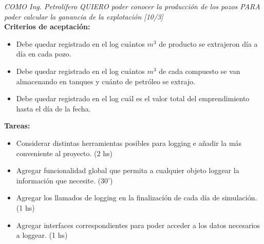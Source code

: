 \begin{tcolorbox}
\textit{ COMO Ing. Petrolífero QUIERO poder conocer la producción de los pozos PARA poder calcular la ganancia de la explotación [10/3]}\\

\textbf{Criterios de aceptación:}
\begin{itemize}
	\item Debe quedar registrado en el log cuántos $m^3$ de producto se extrajeron día a día en cada pozo.
    \item Debe quedar registrado en el log cuántos $m^3$ de cada compuesto se van almacenando en tanques y cuánto de petróleo se extrajo.
    \item Debe quedar registrado en el log cuál es el valor total del emprendimiento hasta el día de la fecha.
\end{itemize}

\textbf{Tareas:}
\begin{itemize}
	\item Considerar distintas herramientas posibles para logging e añadir la más conveniente al proyecto. (2 hs)
  \item Agregar funcionalidad global que permita a cualquier objeto loggear la información que necesite. (30')
    \item Agregar los llamados de logging en la finalización de cada día de simulación. (1 hs)
    \item Agregar interfaces correspondientes para poder acceder a los datos necesarios a loggear. (1 hs)
\end{itemize}
\end{tcolorbox}

